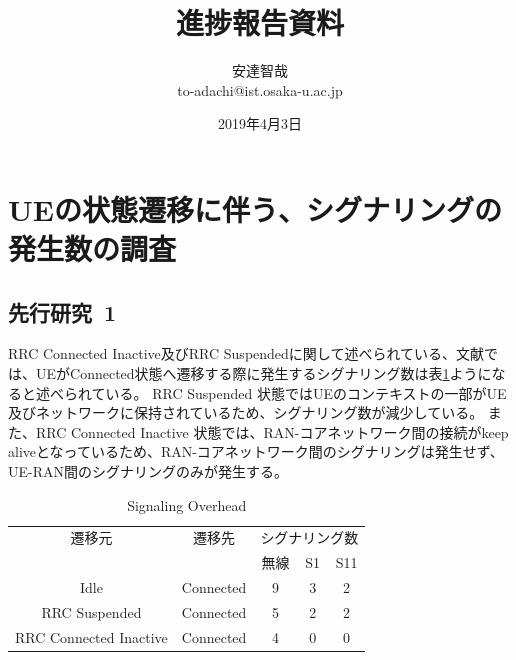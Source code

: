 \documentclass[a4j]{ujarticle}
\title{進捗報告資料}
\author{安達智哉\\to-adachi@ist.osaka-u.ac.jp}
\date{2019年4月3日}
\begin{document}
\maketitle



\section{UEの状態遷移に伴う、シグナリングの発生数の調査}
\subsection{先行研究~1}
RRC Connected Inactive及びRRC Suspendedに関して述べられている、文献\cite{RRCStateHandlingfor5G}では、UEがConnected状態へ遷移する際に発生するシグナリング数は表\ref{table:signalings}ようになると述べられている。
RRC Suspended 状態ではUEのコンテキストの一部がUE及びネットワークに保持されているため、シグナリング数が減少している。
また、RRC Connected Inactive 状態では、RAN-コアネットワーク間の接続がkeep aliveとなっているため、RAN-コアネットワーク間のシグナリングは発生せず、UE-RAN間のシグナリングのみが発生する。
\begin{table}[htbp]
  \centering
  \caption{Signaling Overhead}
  \label{table:signalings}
  \begin{tabular}{ccccc}
    \hline
    遷移元                  & 遷移先              & \multicolumn{3}{c}{シグナリング数} \\
                            &                     & 無線      & S1     & S11     \\ \hline \hline
    Idle                    & Connected           & 9         & 3      & 2       \\
    RRC Suspended           & Connected           & 5         & 2      & 2       \\
    RRC Connected Inactive  & Connected           & 4         & 0      & 0       \\ \hline
  \end{tabular}
\end{table}
\end{document}
